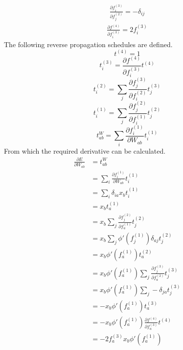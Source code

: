 \documentclass[fleqn]{report}
\begin{document}
\begin{equation}
    \begin{split}
        \frac{\partial f^{(3)}_i}{\partial f^{(2)}_j} = - \delta_{ij}
    \end{split}
\end{equation}
\begin{equation}
    \begin{split}
        \frac{\partial f^{(4)}}{\partial f^{(3)}_i} = 2 f^{(3)}_i
    \end{split}
\end{equation}
The following reverse propagation schedules are defined.
\begin{equation}
    t^{(4)} = 1
\end{equation}
\begin{equation}
    t^{(3)}_i = \frac{\partial f^{(4)}}{\partial f^{(3)}_i} t^{(4)}
\end{equation}
\begin{equation}
    t^{(2)}_i = \sum_j \frac{\partial f^{(3)}_j}{\partial f^{(2)}_i} t^{(3)}_j
\end{equation}
\begin{equation}
    t^{(1)}_i = \sum_j \frac{\partial f^{(2)}_j}{\partial f^{(1)}_i} t^{(2)}_j
\end{equation}
\begin{equation}
    t^{W}_{ab} = \sum_i \frac{\partial f^{(1)}_i}{\partial W_{ab}} t^{(1)}_i
\end{equation}
From which the required derivative can be calculated.
\begin{equation}
    \begin{split}
        \frac{\partial E}{\partial W_{ab}} & = t^{W}_{ab} \\
        & = \sum_i \frac{\partial f^{(1)}_i}{\partial W_{ab}} t^{(1)}_i \\
        & = \sum_i \delta_{ia} x_b t^{(1)}_i \\
        & = x_b t^{(1)}_a \\
        & = x_b \sum_j \frac{\partial f^{(2)}_j}{\partial f^{(1)}_a} t^{(2)}_j \\
        & = x_b \sum_j \phi'(f^{(1)}_j) \delta_{aj} t^{(2)}_j \\
        & = x_b \phi'(f^{(1)}_a) t^{(2)}_a \\
        & = x_b \phi'(f^{(1)}_a) \sum_j \frac{\partial f^{(3)}_j}{\partial f^{(2)}_a} t^{(3)}_j \\
        & = x_b \phi'(f^{(1)}_a) \sum_j - \delta_{ja} t^{(3)}_j \\
        & = - x_b \phi'(f^{(1)}_a) t^{(3)}_a \\
        & = - x_b \phi'(f^{(1)}_a) \frac{\partial f^{(4)}}{\partial f^{(3)}_a} t^{(4)} \\
        & = - 2 f^{(3)}_a x_b \phi'(f^{(1)}_a) \\
    \end{split}
\end{equation}
\end{document}
